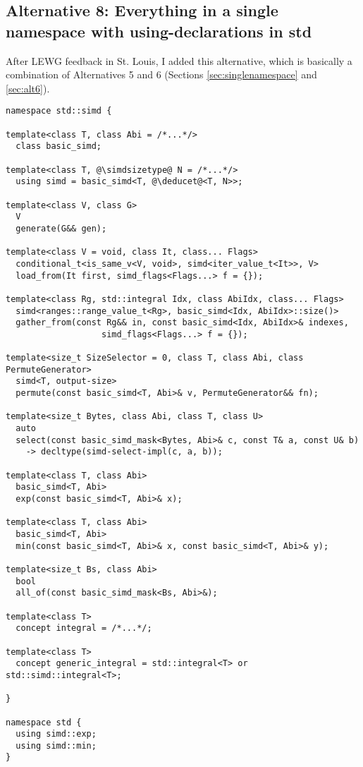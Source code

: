 \subsection{Alternative 8: Everything in a single namespace with using-declarations in std}
\label{sec:singlenamespace2}

After LEWG feedback in St. Louis, I added this alternative, which is basically
a combination of Alternatives 5 and 6 (Sections \ref{sec:singlenamespace} and
\ref{sec:alt6}).

\medskip\begin{lstlisting}
namespace std::simd {

template<class T, class Abi = /*...*/>
  class basic_simd;

template<class T, @\simdsizetype@ N = /*...*/>
  using simd = basic_simd<T, @\deducet@<T, N>>;

template<class V, class G>
  V
  generate(G&& gen);

template<class V = void, class It, class... Flags>
  conditional_t<is_same_v<V, void>, simd<iter_value_t<It>>, V>
  load_from(It first, simd_flags<Flags...> f = {});

template<class Rg, std::integral Idx, class AbiIdx, class... Flags>
  simd<ranges::range_value_t<Rg>, basic_simd<Idx, AbiIdx>::size()>
  gather_from(const Rg&& in, const basic_simd<Idx, AbiIdx>& indexes,
                   simd_flags<Flags...> f = {});

template<size_t SizeSelector = 0, class T, class Abi, class PermuteGenerator>
  simd<T, output-size>
  permute(const basic_simd<T, Abi>& v, PermuteGenerator&& fn);

template<size_t Bytes, class Abi, class T, class U>
  auto
  select(const basic_simd_mask<Bytes, Abi>& c, const T& a, const U& b)
    -> decltype(simd-select-impl(c, a, b));

template<class T, class Abi>
  basic_simd<T, Abi>
  exp(const basic_simd<T, Abi>& x);

template<class T, class Abi>
  basic_simd<T, Abi>
  min(const basic_simd<T, Abi>& x, const basic_simd<T, Abi>& y);

template<size_t Bs, class Abi>
  bool
  all_of(const basic_simd_mask<Bs, Abi>&);

template<class T>
  concept integral = /*...*/;

template<class T>
  concept generic_integral = std::integral<T> or std::simd::integral<T>;

}

namespace std {
  using simd::exp;
  using simd::min;
}
\end{lstlisting}

